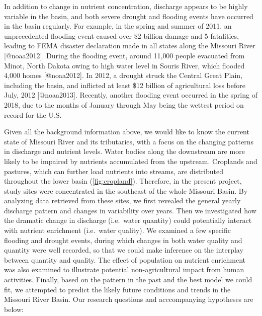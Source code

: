 \documentclass[12pt,]{article}
\begin{document}
In addition to change in nutrient concentration, discharge appears to be
highly variable in the basin, and both severe drought and flooding
events have occurred in the basin regularly. For example, in the spring
and summer of 2011, an unprecedented flooding event caused over \$2
billion damage and 5 fatalities, leading to FEMA disaster declaration
made in all states along the Missouri River {[}@noaa2012{]}. During the
flooding event, around 11,000 people evacuated from Minot, North Dakota
owing to high water level in Souris River, which flooded 4,000 homes
{[}@noaa2012{]}. In 2012, a drought struck the Central Great Plain,
including the basin, and inflicted at least \$12 billion of agricultural
loss before July, 2012 {[}@noaa2013{]}. Recently, another flooding event
occurred in the spring of 2018, due to the months of January through May
being the wettest period on record for the U.S.

Given all the background information above, we would like to know the
current state of Missouri River and its tributaries, with a focus on the
changing patterns in discharge and nutrient levels. Water bodies along
the downstream are more likely to be impaired by nutrients accumulated
from the upstream. Croplands and pastures, which can further load
nutrients into streams, are distributed throughout the lower basin
(\autoref{fig:cropland}). Therefore, in the present project, study sites
were concentrated in the southeast of the whole Missouri Basin. By
analyzing data retrieved from these sites, we first revealed the general
yearly discharge pattern and changes in variability over years. Then we
investigated how the dramatic change in discharge (i.e.~water quantity)
could potentially interact with nutrient enrichment (i.e.~water
quality). We examined a few specific flooding and drought events, during
which changes in both water quality and quantity were well recorded, so
that we could make inference on the interplay between quantity and
quality. The effect of population on nutrient enrichment was also
examined to illustrate potential non-agricultural impact from human
activities. Finally, based on the pattern in the past and the best model
we could fit, we attempted to predict the likely future conditions and
trends in the Missouri River Basin. Our research questions and
acccompanying hypotheses are below:
\end{document}
